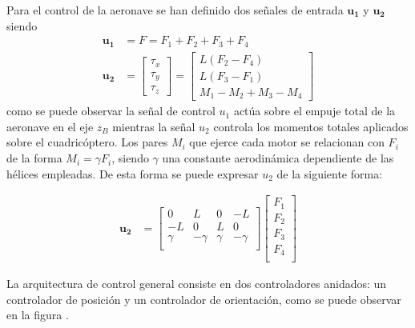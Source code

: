 Para el control de la aeronave se han definido dos señales de entrada $\mathbf{u_1}$ y $\mathbf{u_2}$ siendo 
\begin{align}
	\mathbf{u_1}  &= F =  F_1 +F_2 +F_3 +F_4  \label{eq:u1}\\
	\mathbf{u_2}  &= \begin{bmatrix} \tau_x\\ 
		\tau_y\\
		\tau_z
	\end{bmatrix} =\begin{bmatrix}
	L (F_2-F_4)\\
	L (F_3-F_1)\\
	M_1 - M_2 + M_3 - M_4
\end{bmatrix}
\end{align} 
como se puede observar la señal de control $u_1$ actúa sobre el empuje total de la aeronave en el eje $z_B$ mientras la señal $u_2$ controla los momentos totales aplicados sobre el cuadricóptero. Los pares $M_i$ que ejerce cada motor se relacionan con $F_i$ de la forma $M_i = \gamma F_i$, siendo $\gamma$ una constante aerodinámica dependiente de las hélices empleadas. De esta forma se puede expresar $u_2$ de la siguiente forma:

\begin{align}
	\mathbf{u_2}  &= \begin{bmatrix}
		0&L&0&-L\\
		-L&0&L&0\\
		\gamma&-\gamma&\gamma&-\gamma\\
	\end{bmatrix}\begin{bmatrix} F_1\\ 
	F_2\\ 
	F_3\\ 
	F_4\\ 
\end{bmatrix}\label{eq:u2}
\end{align} 

La arquitectura de control general consiste en dos controladores anidados: un controlador de posición y un controlador de orientación, como se puede observar en la figura .




